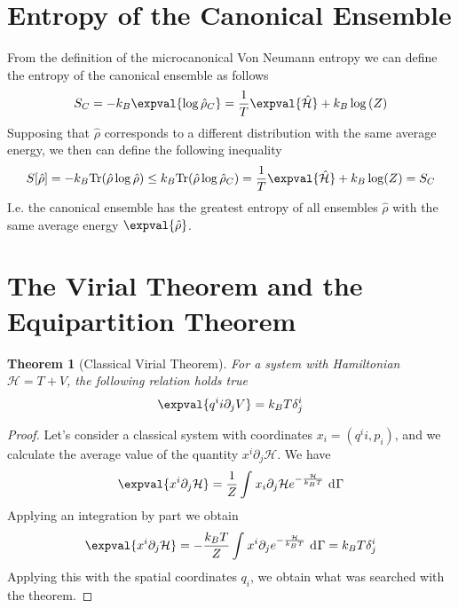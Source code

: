 \documentclass[a4paper, 11pt]{book}
\renewcommand{\trace}{\mathrm{Tr}}
\newcommand{\1}{\opr{\mathds{1}}}
\newcommand{\diff}[2][]{\ \mathrm{d}^{#1}#2}
\newcommand{\ham}{\mathcal{H}}
\newcommand{\opr}[1]{\hat{#1}}
\newcommand{\dopr}{\hat{\rho}}
\newtheorem{thm}{Theorem}
\theoremstyle{plain}
\begin{document}
		\section{Entropy of the Canonical Ensemble}
		From the definition of the microcanonical Von Neumann entropy we can define the entropy of the canonical ensemble as follows
		\begin{equation}
			S_C=-k_B\expval{\log\dopr_C}=\frac{1}{T}\expval{\opr{\ham}}+k_B\log\left( Z \right)
			\label{eq:canonicalentropy}
		\end{equation}
		Supposing that $\dopr$ corresponds to a different distribution with the same average energy, we then can define the following inequality
		\begin{equation}
			S[\dopr]=-k_B\trace(\dopr\log\dopr)\le k_B\trace(\dopr\log\dopr_C)=\frac{1}{T}\expval{\opr{\ham}}+k_B\log(Z)=S_C
			\label{eq:canonicalentropydisuguagliance}
		\end{equation}
		I.e. the canonical ensemble has the greatest entropy of all ensembles $\dopr$ with the same average energy $\expval{\dopr}$.
		\section{The Virial Theorem and the Equipartition Theorem}
		\begin{thm}[Classical Virial Theorem]
			For a system with Hamiltonian $\ham=T+V$, the following relation holds true
			\begin{equation}
				\expval{q^ii\partial_jV}=k_BT\delta_j^i
				\label{eq:virialtheoremclassical}
			\end{equation}
		\end{thm}
		\begin{proof}
			Let's consider a classical system with coordinates $x_i=(q^ii,p_i)$, and we calculate the average value of the quantity $x^i\partial_j\ham$. We have
			\begin{equation*}
				\expval{x^i\partial_j\ham}=\frac{1}{Z}\int_{}^{}x_i\partial_j\ham e^{-\frac{\ham}{k_BT}}\diff{\Gamma}
			\end{equation*}
			Applying an integration by part we obtain
			\begin{equation}
				\expval{x^i\partial_j\ham}=-\frac{k_BT}{Z}\int_{}^{}x^i\partial_je^{-\frac{\ham}{k_BT}}\diff{\Gamma}=k_BT\delta_{j}^i
				\label{eq:virialtheoremcomplete}
			\end{equation}
			Applying this with the spatial coordinates $q_i$, we obtain what was searched with the theorem.
		\end{proof}
\end{document}
